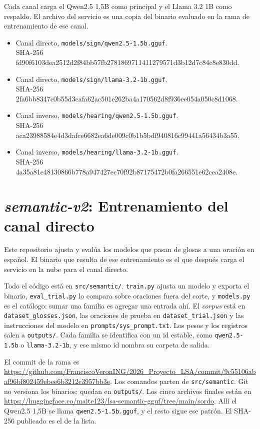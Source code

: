 Cada canal carga el Qwen2.5 1,5B como principal y el Llama 3.2 1B como respaldo. El archivo del servicio es una copia del binario evaluado en la rama de entrenamiento de ese canal.
\begin{itemize}
    \item Canal directo, \texttt{models/sign/qwen2.5-1.5b.gguf}.\\
SHA-256 {\ttfamily\small  fd90f6103dea2512d2f84bb57fb27818\allowbreak 69711411279571d3b12d7c84c8e830dd}.
    \item Canal directo, \texttt{models/sign/llama-3.2-1b.gguf}.\\
SHA-256 {\ttfamily\small  2fa6bb8347c0b55d3cafa62ac501e262\allowbreak ba4a170562d8f936ee054a050c8d1068}.
    \item Canal inverso, \texttt{models/hearing/qwen2.5-1.5b.gguf}.\\
SHA-256 {\ttfamily\small  aca23988584e4d3dafce6682ea6de009\allowbreak c0b1b5bdf940816c99441a56434b3a55}.
    \item Canal inverso, \texttt{models/hearing/llama-3.2-1b.gguf}.\\
SHA-256 {\ttfamily\small  4a35a81e48130866b778a947427ec70f\allowbreak 92b87175472b0fa266551e62cea2408e}.
\end{itemize}

\section{\textit{semantic-v2}: Entrenamiento del canal directo}
Este repositorio ajusta y evalúa los modelos que pasan de glosas a una oración en español. El binario que resulta de ese entrenamiento es el que después carga el servicio en la nube para el canal directo.

Todo el código está en \texttt{src/semantic/}. \texttt{train.py} ajusta un modelo y exporta el binario, \texttt{eval\_trial.py} lo compara sobre oraciones fuera del corte, y \texttt{models.py} es el catálogo: sumar una familia es agregar una entrada ahí. El \textit{corpus} está en \texttt{dataset\_glosses.json}, las oraciones de prueba en \texttt{dataset\_trial.json} y las instrucciones del modelo en \texttt{prompts/sys\_prompt.txt}. Los pesos y los registros salen a \texttt{outputs/}. Cada familia se identifica con un id estable, como \texttt{qwen2.5-1.5b} o \texttt{llama-3.2-1b}, y ese mismo id nombra su carpeta de salida.

El commit de la rama es \url{https://github.com/FranciscoVeronING/2026_Proyecto_LSA/commit/9c55106abaf96bf802459ebee6b3212c3957bb3e}. Los comandos parten de \texttt{src/semantic}. Git no versiona los binarios: quedan en \texttt{outputs/}. Los cinco archivos finales están en \url{https://huggingface.co/maite123/lsa-semantic-gguf/tree/main/sordo}. Allí el Qwen2.5 1,5B se llama \texttt{qwen2.5-1.5b.gguf}, y el resto sigue ese patrón. El SHA-256 publicado es el de la lista.

